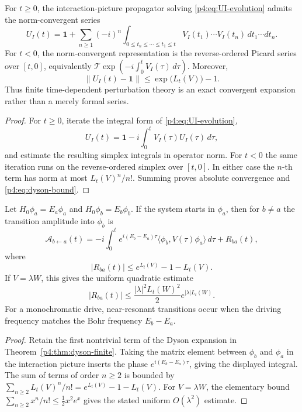 \documentclass[12pt,a4paper]{article}
\begin{document}
\begin{theorem}
\label{p4:thm:dyson-finite}
For \(t\ge0\), the interaction-picture propagator solving
\eqref{p4:eq:UI-evolution} admits the norm-convergent series
\begin{equation}
\label{p4:eq:dyson-series}
U_I(t)
=
\mathbf 1
+\sum_{n\ge 1}(-i)^n
\int_{0\le t_n\le\cdots\le t_1\le t}
V_I(t_1)\cdots V_I(t_n)
\,dt_1\cdots dt_n.
\end{equation}
For \(t<0\), the norm-convergent representation is the reverse-ordered
Picard series over \([t,0]\), equivalently
\(\mathcal T\exp(-i\int_0^tV_I(\tau)\,d\tau)\).
Moreover,
\begin{equation}
\label{p4:eq:dyson-bound}
\|U_I(t)-\mathbf 1\|
\le
\exp\bigl(L_t(V)\bigr)-1.
\end{equation}
Thus finite time-dependent perturbation theory is an exact convergent expansion rather than a merely formal series.
\end{theorem}


\begin{proof}
For \(t\ge0\), iterate the integral form of \eqref{p4:eq:UI-evolution},
\[
U_I(t)=\mathbf 1-i\int_0^t V_I(\tau)U_I(\tau)\,d\tau,
\]
and estimate the resulting simplex integrals in operator norm.  For \(t<0\)
the same iteration runs on the reverse-ordered simplex over \([t,0]\).
In either case the \(n\)-th term has norm at most
\(L_t(V)^n/n!\).  Summing proves absolute convergence and
\eqref{p4:eq:dyson-bound}.
\end{proof}

\begin{corollary}
\label{p4:cor:first-order-transition}
Let $H_0\phi_a=E_a\phi_a$ and $H_0\phi_b=E_b\phi_b$.
If the system starts in \(\phi_a\), then for \(b\ne a\) the transition
amplitude into \(\phi_b\) is
\begin{equation}
\label{p4:eq:first-order-transition}
\mathcal A_{b\leftarrow a}(t)
=
-i\int_0^t e^{i(E_b-E_a)\tau}
\langle \phi_b,V(\tau)\phi_a\rangle\,d\tau
+R_{ba}(t),
\end{equation}
where
\[
|R_{ba}(t)|
\le e^{L_t(V)}-1-L_t(V).
\]
If \(V=\lambda W\), this gives the uniform quadratic estimate
\[
|R_{ba}(t)|
\le
\frac{|\lambda|^2L_t(W)^2}{2}
e^{|\lambda|L_t(W)}.
\]
For a monochromatic drive, near-resonant transitions occur when the driving frequency matches the Bohr frequency $E_b-E_a$.
\end{corollary}

\begin{proof}
Retain the first nontrivial term of the Dyson expansion in
Theorem~\ref{p4:thm:dyson-finite}.  Taking the matrix element between
\(\phi_b\) and \(\phi_a\) in the interaction picture inserts the phase
\(e^{i(E_b-E_a)\tau}\), giving the displayed integral.  The sum of terms of
order \(n\ge2\) is bounded by
\(\sum_{n\ge2}L_t(V)^n/n!=e^{L_t(V)}-1-L_t(V)\).
For \(V=\lambda W\), the elementary bound
\(\sum_{n\ge2}x^n/n!\le\frac12x^2e^x\) gives the stated uniform
\(O(\lambda^2)\) estimate.
\end{proof}
\end{document}
